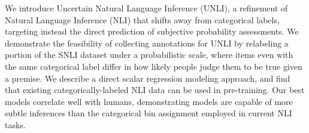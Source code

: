 We introduce Uncertain Natural Language Inference (UNLI), a refinement of Natural Language Inference (NLI) that shifts away from categorical labels, targeting instead the direct prediction of subjective probability assessments. We demonstrate the feasibility of collecting annotations for UNLI by relabeling a portion of the SNLI dataset under a probabilistic scale, where items even with the same categorical label differ in how likely people judge them to be true given a premise. We describe a direct scalar regression modeling approach, and find that existing categorically-labeled NLI data can be used in pre-training. Our best models correlate well with humans, demonstrating models are capable of more subtle inferences than the categorical bin assignment employed in current NLI tasks.
